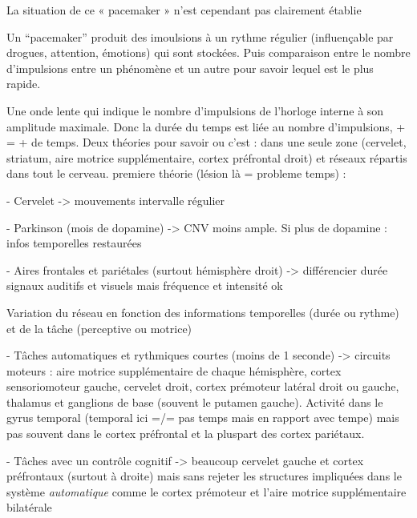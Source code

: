 \documentclass[12pt,fleqn,oneside,openany]{book} %
\begin{document}
\begin{figure}[h]
\end{figure}

La situation de ce « pacemaker » n'est cependant pas clairement établie
	
	Un ``pacemaker''  produit des imoulsions à un rythme régulier (influençable par drogues, attention, émotions) qui sont stockées. Puis comparaison entre le nombre d'impulsions entre un phénomène et un autre pour savoir lequel est le plus rapide.

	Une onde lente qui indique le nombre d'impulsions de l'horloge interne à son amplitude maximale. Donc la durée du temps est liée au nombre d'impulsions, + = + de temps.
	Deux théories pour savoir ou c'est : dans une seule zone (cervelet, striatum, aire motrice supplémentaire, cortex préfrontal droit) et réseaux répartis dans tout le cerveau.
	premiere théorie (lésion là = probleme temps) : 

		- Cervelet -> mouvements intervalle régulier

		- Parkinson (mois de dopamine) -> CNV moins ample. Si plus de dopamine : infos temporelles restaurées

		- Aires frontales et pariétales (surtout hémisphère droit) -> différencier durée signaux auditifs et visuels mais fréquence et intensité ok

	Variation du réseau en fonction des informations temporelles (durée ou rythme) et de la tâche (perceptive ou motrice)

		- Tâches automatiques et rythmiques courtes (moins de 1 seconde) -> circuits moteurs : aire motrice supplémentaire de chaque hémisphère, cortex sensoriomoteur gauche, cervelet droit, cortex prémoteur latéral droit ou gauche, thalamus et ganglions de base (souvent le putamen gauche). Activité dans le gyrus temporal (temporal ici =/= pas temps mais en rapport avec tempe) mais pas souvent dans le cortex préfrontal et la pluspart des cortex pariétaux.

		- Tâches avec un contrôle cognitif -> beaucoup cervelet gauche et cortex préfrontaux (surtout à droite) mais sans rejeter les structures impliquées dans le système \emph{automatique} comme le cortex prémoteur et l'aire motrice supplémentaire bilatérale
\end{document}
